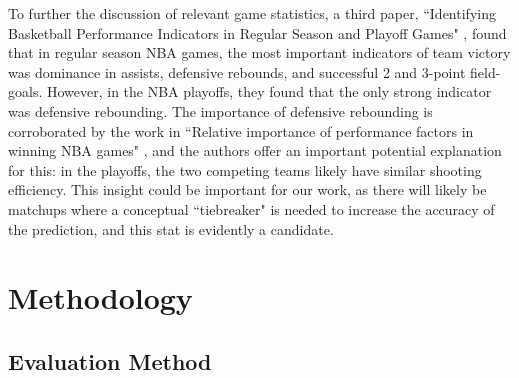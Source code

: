 \documentclass[letterpaper]{article} %
\begin{document}
To further the discussion of relevant game statistics, a third paper, ``Identifying Basketball Performance Indicators in Regular Season and Playoff Games" \cite{IdentifyingBasketballPerformanceIndicatorsinRegularSeasonandPlayoffGames}, found that in regular season NBA games, the most important indicators of team victory was dominance in assists, defensive rebounds,  and successful 2 and 3-point field-goals. However, in the NBA playoffs, they found that the only strong indicator was defensive rebounding. The importance of defensive rebounding is corroborated by the work in ``Relative importance of performance factors in winning NBA games" \cite{RelativeImportanceofPerformanceFactorsinWinningNBAGamesinRegularSeasonversusPlayoffs}, and the authors offer an important potential explanation for this: in the playoffs, the two competing teams likely have similar shooting efficiency. This insight could be important for our work, as there will likely be matchups where a conceptual ``tiebreaker" is needed to increase the accuracy of the prediction, and this stat is evidently a candidate.


\section{Methodology}

\subsection{Evaluation Method} \label{evaluation-method}
\end{document}
